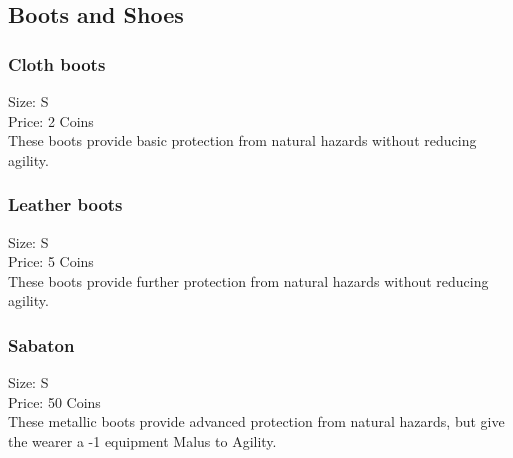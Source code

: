 \subsection{Boots and Shoes}\label{subsec:bootsAndShoes}

\subsubsection{Cloth boots}\label{item:clothboots}
Size: S\\
Price: 2 Coins\\
These boots provide basic protection from natural hazards without reducing agility.

\subsubsection{Leather boots}\label{item:leatherboots}
Size: S\\
Price: 5 Coins\\
These boots provide further protection from natural hazards without reducing agility.

\subsubsection{Sabaton}\label{item:sabaton}
Size: S\\
Price: 50 Coins\\
These metallic boots provide advanced protection from natural hazards, but give the wearer a -1 equipment Malus to Agility.